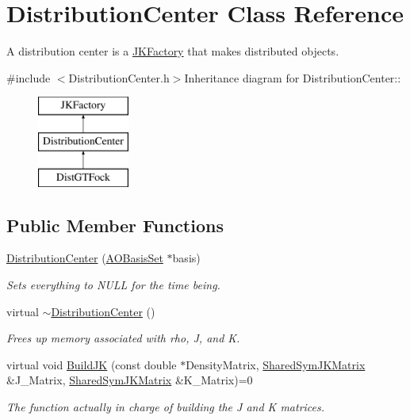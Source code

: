 \hypertarget{classJKBuilder_1_1DistributionCenter}{
\section{DistributionCenter Class Reference}
\label{classJKBuilder_1_1DistributionCenter}
}


A distribution center is a \hyperlink{classJKBuilder_1_1JKFactory}{JKFactory} that makes distributed objects.  


{\ttfamily \#include $<$DistributionCenter.h$>$}Inheritance diagram for DistributionCenter::\begin{figure}[H]
\begin{center}
\leavevmode
\includegraphics[height=3cm]{classJKBuilder_1_1DistributionCenter}
\end{center}
\end{figure}
\subsection*{Public Member Functions}
\begin{DoxyCompactItemize}
\item 
\hyperlink{classJKBuilder_1_1DistributionCenter_a188ebdd377e09a6e048a5e3f0b47a3ec}{DistributionCenter} (\hyperlink{classJKBuilder_1_1AOBasisSet}{AOBasisSet} $\ast$basis)
\begin{DoxyCompactList}\small\item\em Sets everything to NULL for the time being. \item\end{DoxyCompactList}\item 
virtual \hyperlink{classJKBuilder_1_1DistributionCenter_a2e0afd90ae098233a728d3c384196de2}{$\sim$DistributionCenter} ()
\begin{DoxyCompactList}\small\item\em Frees up memory associated with rho, J, and K. \item\end{DoxyCompactList}\item 
virtual void \hyperlink{classJKBuilder_1_1JKFactory_ae253b309dafe3ce003fdabfd315318b8}{BuildJK} (const double $\ast$DensityMatrix, \hyperlink{namespaceJKBuilder_aef21bc37b7cf7bc5ebb5a48628db8d0f}{SharedSymJKMatrix} \&J\_\-Matrix, \hyperlink{namespaceJKBuilder_aef21bc37b7cf7bc5ebb5a48628db8d0f}{SharedSymJKMatrix} \&K\_\-Matrix)=0
\begin{DoxyCompactList}\small\item\em The function actually in charge of building the J and K matrices. \item\end{DoxyCompactList}\end{DoxyCompactItemize}
